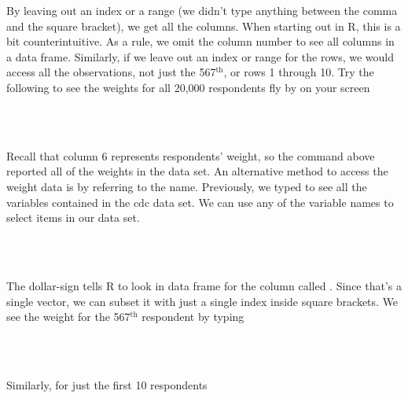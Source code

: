 \documentclass[11pt]{article}
\begin{document}
By leaving out an index or a range (we didn't type anything between the comma and the square bracket), we get all the columns. When starting out in R, this is a bit counterintuitive. As a rule, we omit the column number to see all columns in a data frame. Similarly, if we leave out an index or range for the rows, we would access all the observations, not just the 567$^{\textrm{th}}$, or rows 1 through 10. Try the following to see the weights for all 20,000 respondents fly by on your screen

\ttfamily\noindent
\hlstd{}\hspace*{\fill}\\
\hlstd{}\hlkeyword{[}\hlkeyword{,}\hlkeyword{]}\hspace*{\fill}\\
\normalfont

Recall that column 6 represents respondents' weight, so the command above reported all of the weights in the data set. An alternative method to access the weight data is by referring to the name.  Previously, we typed \texttt{\hlkeyword{(}\hlkeyword{)}} to see all the variables contained in the cdc data set. We can use any of the variable names to select items in our data set. 

\ttfamily\noindent
\hlstd{}\hspace*{\fill}\\
\hlstd{}\hlkeyword{\usebox{\hlnormalsizeboxdollar}}\hspace*{\fill}\\
\normalfont

The dollar-sign tells R to look in data frame \texttt{} for the column called \texttt{}.  Since that's a single vector, we can subset it with just a single index inside square brackets.  We see the weight for the 567$^{\textrm{th}}$ respondent by typing

\ttfamily\noindent
\hlstd{}\hspace*{\fill}\\
\hlstd{}\hlkeyword{\usebox{\hlnormalsizeboxdollar}}\hlkeyword{[}\hlkeyword{]}\hspace*{\fill}\\
\normalfont

Similarly, for just the first 10 respondents

\ttfamily\noindent
\hlstd{}\hspace*{\fill}\\
\hlstd{}\hlkeyword{\usebox{\hlnormalsizeboxdollar}}\hlkeyword{[}\hlkeyword{:}\hlkeyword{]}\hspace*{\fill}\\
\normalfont
\end{document}
